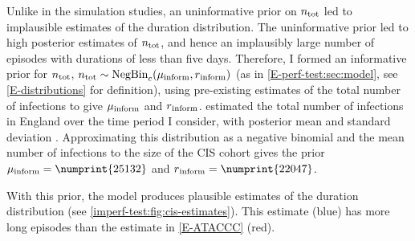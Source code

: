 \documentclass[thesis.tex]{subfiles}
\begin{document}
Unlike in the simulation studies, an uninformative prior on $n_\text{tot}$ led to implausible estimates of the duration distribution.
The uninformative prior led to high posterior estimates of $n_\text{tot}$, and hence an implausibly large number of episodes with durations of less than five days.
Therefore, I formed an informative prior for $n_\text{tot}$, $n_\text{tot} \sim \operatorname{NegBin}_{c}(\mu{_{\text{inform}}}, r{_{\text{inform}}})$ (as in \cref{E-perf-test:sec:model}, see \cref{E-distributions} for definition), using pre-existing estimates of the total number of infections to give $\mu{_{\text{inform}}}$ and $r{_{\text{inform}}}$.
\Textcite{birrellRTM2} estimated the total number of infections in England over the time period I consider, with posterior mean  and standard deviation .
Approximating this distribution as a negative binomial and the mean number of infections to the size of the CIS cohort gives the prior $\mu\inform = \numprint{25132}$ and $r\inform = \numprint{22047}$.

With this prior, the model produces plausible estimates of the duration distribution (see \cref{imperf-test:fig:cis-estimates}).
This estimate (blue) has more long episodes than the estimate in \cref{E-ATACCC} (red).
\end{document}
